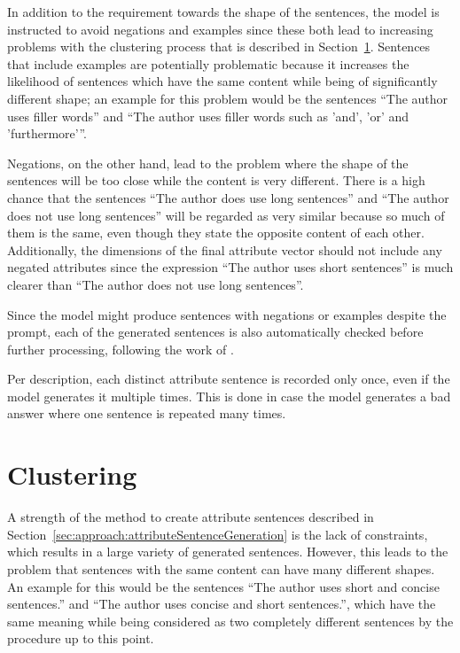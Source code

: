 In addition to the requirement towards the shape of the sentences, the model is instructed to avoid negations and examples since these both lead to increasing problems with the clustering process that is described in Section~\ref{sec:approach:clustering}.
Sentences that include examples are potentially problematic because it increases the likelihood of sentences which have the same content while being of significantly different shape; an example for this problem would be the sentences \enquote{The author uses filler words} and \enquote{The author uses filler words such as 'and', 'or' and 'furthermore'}.%

Negations, on the other hand, lead to the problem where the shape of the sentences will be too close while the content is very different. There is a high chance that the sentences \enquote{The author does use long sentences} and \enquote{The author does not use long sentences} will be regarded as very similar because so much of them is the same, even though they state the opposite content of each other.
Additionally, the dimensions of the final attribute vector should not include any negated attributes since the expression \enquote{The author uses short sentences} is much clearer than \enquote{The author does not use long sentences}.

Since the model might produce sentences with negations or examples despite the prompt, each of the generated sentences is also automatically checked before further processing, following the work of \citet{patelLearningInterpretableStyle2023}.

Per description, each distinct attribute sentence is recorded only once, even if the model generates it multiple times. This is done in case the model generates a bad answer where one sentence is repeated many times.


\section{Clustering}
\label{sec:approach:clustering}
A strength of the method to create attribute sentences described in Section~\ref{sec:approach:attributeSentenceGeneration} is the lack of constraints, which results in a large variety of generated sentences. However, this leads to the problem that sentences with the same content can have many different shapes. An example for this would be the sentences \enquote{The author uses short and concise sentences.} and \enquote{The author uses concise and short sentences.}, which have the same meaning while being considered as two completely different sentences by the procedure up to this point.

